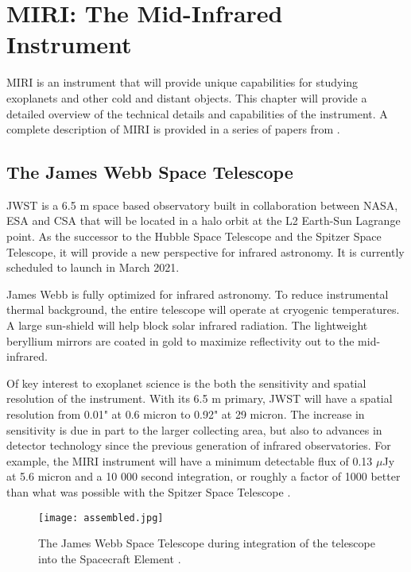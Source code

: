 \chapter{MIRI: The Mid-Infrared Instrument}
MIRI is an instrument that will provide unique capabilities for studying exoplanets and other cold and distant objects. This chapter will provide a detailed overview of the technical details and capabilities of the instrument. A complete description of MIRI is provided in a series of papers from \parencite{MIRI1,MIRI2,MIRI3, MIRI4,MIRI5,MIRI6,MIRI7,MIRI8,MIRI9}.
%
%
\section{The James Webb Space Telescope}
JWST is a 6.5 m space based observatory built in collaboration between NASA, ESA and CSA that will be located in a halo orbit at the L2 Earth-Sun Lagrange point. 
As the successor to the Hubble Space Telescope and the Spitzer Space Telescope, it will provide a new perspective for infrared astronomy. 
It is currently scheduled to launch in March 2021.

James Webb is fully optimized for infrared astronomy. 
To reduce instrumental thermal background, the entire telescope will operate at cryogenic temperatures. 
A large sun-shield will help block solar infrared radiation.
The lightweight beryllium mirrors are coated in gold to maximize reflectivity out to the mid-infrared.

Of key interest to exoplanet science is the both the sensitivity and spatial resolution of the instrument. 
With its 6.5 m primary, JWST will have a spatial resolution from 0.01" at 0.6 micron to 0.92" at 29 micron.
The increase in sensitivity is due in part to the larger collecting area, but also to advances in detector technology since the previous generation of infrared observatories.
For example, the MIRI instrument will have a minimum detectable flux of 0.13 $\mu$Jy at 5.6 micron and a 10 000 second integration, or roughly a factor of 1000 better than what was possible with the Spitzer Space Telescope \parencite{MIRI9}.
\begin{figure}[t]
	\texttt{[image: assembled.jpg]}
	\caption{The James Webb Space Telescope during integration of the telescope into the Spacecraft Element \parencite{assembled}. }
	\label{fig:jwst}
\end{figure}

